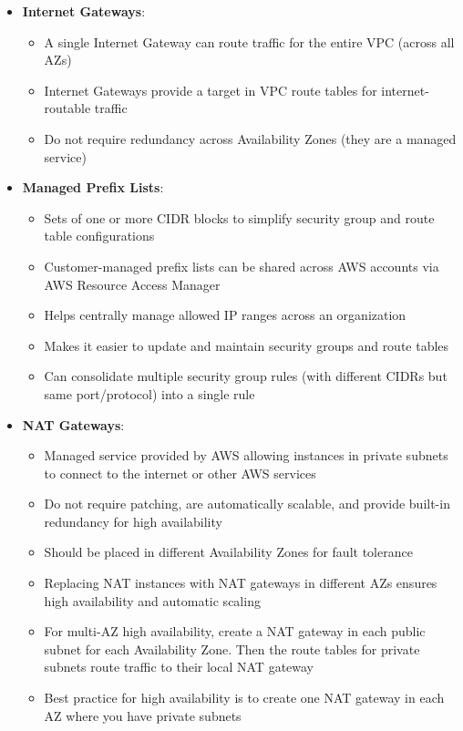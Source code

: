 \documentclass[11pt,a4paper]{report}
\begin{document}
\begin{itemize}
  \item \textbf{Internet Gateways}:
\begin{itemize}
  \item A single Internet Gateway can route traffic for the entire VPC (across all AZs)
  \item Internet Gateways provide a target in VPC route tables for internet-routable traffic
  \item Do not require redundancy across Availability Zones (they are a managed service)
\end{itemize}
  \item \textbf{Managed Prefix Lists}:
\begin{itemize}
  \item Sets of one or more CIDR blocks to simplify security group and route table configurations
  \item Customer-managed prefix lists can be shared across AWS accounts via AWS Resource Access Manager
  \item Helps centrally manage allowed IP ranges across an organization
  \item Makes it easier to update and maintain security groups and route tables
  \item Can consolidate multiple security group rules (with different CIDRs but same port/protocol) into a single rule
\end{itemize}
  \item \textbf{NAT Gateways}:
\begin{itemize}
  \item Managed service provided by AWS allowing instances in private subnets to connect to the internet or other AWS services
  \item Do not require patching, are automatically scalable, and provide built-in redundancy for high availability
  \item Should be placed in different Availability Zones for fault tolerance
  \item Replacing NAT instances with NAT gateways in different AZs ensures high availability and automatic scaling
  \item For multi-AZ high availability, create a NAT gateway in each public subnet for each Availability Zone. Then the route tables for private subnets route traffic to their local NAT gateway
  \item Best practice for high availability is to create one NAT gateway in each AZ where you have private subnets

\end{itemize}
\end{itemize}
\end{document}

